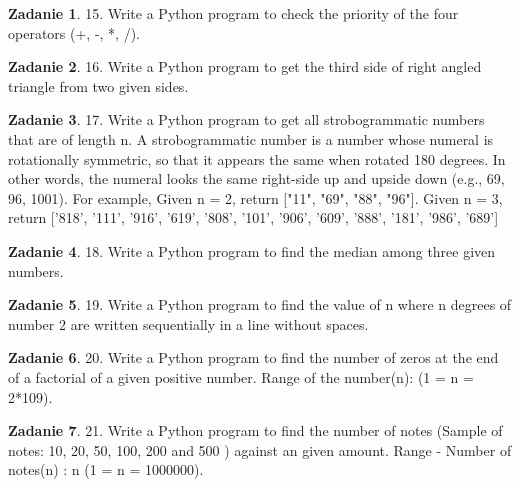 \documentclass[11pt]{article}
\theoremstyle{definition}
\newtheorem{zadanie}{Zadanie}
\begin{document}
\begin{zadanie}


15. Write a Python program to check the priority of the four operators (+, -, *, /). 

\end{zadanie}

\begin{zadanie}


16. Write a Python program to get the third side of right angled triangle from two given sides. 

\end{zadanie}

\begin{zadanie}


17. Write a Python program to get all strobogrammatic numbers that are of length n. 
A strobogrammatic number is a number whose numeral is rotationally symmetric, so that it appears the same when rotated 180 degrees. In other words, the numeral looks the same right-side up and upside down (e.g., 69, 96, 1001).
For example,
Given n = 2, return ["11", "69", "88", "96"].
Given n = 3, return ['818', '111', '916', '619', '808', '101', '906', '609', '888', '181', '986', '689']

\end{zadanie}

\begin{zadanie}


18. Write a Python program to find the median among three given numbers. 

\end{zadanie}

\begin{zadanie}


19. Write a Python program to find the value of n where n degrees of number 2 are written sequentially in a line without spaces. 

\end{zadanie}

\begin{zadanie}


20. Write a Python program to find the number of zeros at the end of a factorial of a given positive number. 
Range of the number(n): (1 = n = 2*109).

\end{zadanie}

\begin{zadanie}


21. Write a Python program to find the number of notes (Sample of notes: 10, 20, 50, 100, 200 and 500 ) against an given amount. 
Range - Number of notes(n) : n (1 = n = 1000000).

\end{zadanie}
\end{document}
